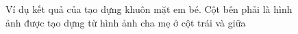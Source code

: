 \documentclass[journal]{IEEEtran}
\begin{document}
\begin{figure}[!t]
\label{refhinh13}
\caption{Ví dụ kết quả của tạo dựng khuôn mặt em bé. Cột bên phải là hình ảnh được tạo dựng từ hình ảnh cha mẹ ở cột trái và giữa}
\end{figure}




\end{document}
